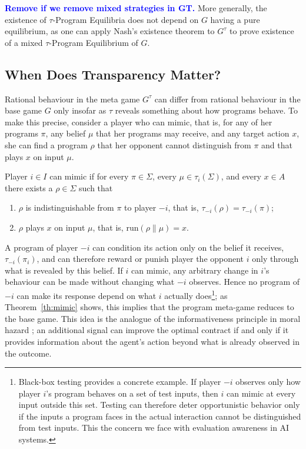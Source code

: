 \documentclass[twoside,11pt]{article}
\newcommand{\boldblue}[1]{\textbf{\textcolor{blue}{#1}}}
\begin{document}
\boldblue{Remove if we remove mixed strategies in GT.}
More generally, the existence of $\tau$-Program Equilibria does not depend on $G$ having a pure equilibrium, as one can apply Nash's existence theorem \citep{nash1950equilibrium, nash1951} to $G^\tau$ to prove existence of a mixed $\tau$-Program Equilibrium of $G$.

\subsection{When Does Transparency Matter?}\label{sec:more-less-transparency}

Rational behaviour in the meta game $G^\tau$ can differ from rational behaviour in the base game $G$ only insofar as $\tau$ reveals something about how programs behave. To make this precise, consider a player who can mimic, that is, for any of her programs $\pi$, any belief $\mu$ that her programs may receive, and any target action $x$, she can find a program $\rho$ that her opponent cannot distinguish from $\pi$ and that plays $x$ on input $\mu$.

\begin{definition}[Mimic]\label{def:mimic}
    Player $i \in I$ can mimic if for every $\pi \in \Sigma$, every $\mu \in \tau_i(\Sigma)$, and every $x \in A$ there exists a $\rho \in \Sigma$ such that
    \begin{enumerate}
        \item $\rho$ is indistinguishable from $\pi$ to player $-i$, that is, $\tau_{-i}(\rho) = \tau_{-i}(\pi)$;
        \item $\rho$ plays $x$ on input $\mu$, that is, $\mathrm{run}(\rho \| \mu)=x$.
    \end{enumerate}
\end{definition}

A program of player $-i$ can condition its action only on the belief it receives, $\tau_{-i}(\pi_i)$, and can therefore reward or punish player the opponent $i$ only through what is revealed by this belief. If $i$ can mimic, any arbitrary change in $i$'s behaviour can be made without changing what $-i$ observes. Hence no program of $-i$ can make its response depend on what $i$ actually does\footnote{Black-box testing provides a concrete example. If player $-i$ observes only how player $i$'s program behaves on a set of test inputs, then $i$ can mimic at every input outside this set. Testing can therefore deter opportunistic behavior only if the inputs a program faces in the actual interaction cannot be distinguished from test inputs. This the concern we face with evaluation awareness in AI systems.}; as Theorem~\ref{th:mimic} shows, this implies that the program meta-game reduces to the base game. This idea is the analogue of the informativeness principle in moral hazard \citep{holmstrom1979moral}; an additional signal can improve the optimal contract if and only if it provides information about the agent's action beyond what is already observed in the outcome.
\end{document}
